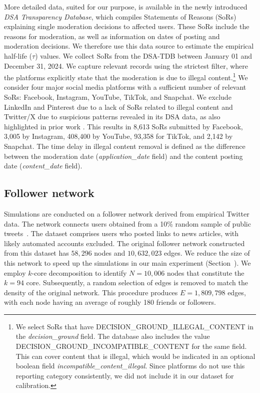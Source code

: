 \documentclass{article}
\begin{document}
More detailed data, suited for our purpose, is available in the newly introduced \textit{DSA Transparency Database}, which compiles Statements of Reasons (SoRs) explaining single moderation decisions to affected users. These SoRs include the reasons for moderation, as well as information on dates of posting and moderation decisions. We therefore use this data source to estimate the empirical half-life ($\tau$) values. We collect SoRs from the DSA-TDB between January 01 and December 31, 2024. We capture relevant records using the strictest filter, where the platforms explicitly state that the moderation is due to illegal content.\footnote{We select SoRs that have DECISION\_GROUND\_ILLEGAL\_CONTENT in the \textit{decision\_ground} field. The database also includes the value DECISION\_GROUND\_INCOMPATIBLE\_CONTENT for the same field. This can cover content that is illegal, which would be indicated in an optional boolean field \textit{incompatible\_content\_illegal}. Since platforms do not use this reporting category consistently, we did not include it in our dataset for calibration.} 
We consider four major social media platforms with a sufficient number of relevant SoRs: Facebook, Instagram, YouTube, TikTok, and Snapchat. We exclude LinkedIn and Pinterest due to a lack of SoRs related to illegal content and Twitter/X due to suspicious patterns revealed in its DSA data, as also highlighted in prior work \cite{trujillo2023dsa}. 
This results in 8,613 SoRs submitted by Facebook, 3,005 by Instagram, 408,400 by YouTube, 93,358 for TikTok, and 2,142 by Snapchat. 
The time delay in illegal content removal is defined as the difference between the moderation date (\textit{application\_date} field) and the content posting date (\textit{content\_date} field). 
 
\subsection*{Follower network}

Simulations are conducted on a follower network derived from empirical Twitter data. The network connects users obtained from a 10\% random sample of public tweets~\cite{Nikolov2020dataset}. The dataset comprises users who posted links to news articles, with likely automated accounts excluded. The original follower network constructed from this dataset has $58{,}296$ nodes and $10{,}632{,}023$ edges. 
We reduce the size of this network to speed up the simulations in our main experiment (Section~). We employ $k$-core decomposition to identify $N = 10{,}006$ nodes that constitute the $k = 94$ core. Subsequently, a random selection of edges is removed to match the density of the original network. This procedure produces $E = 1{,}809{,}798$ edges, with each node having an average of roughly 180 friends or followers.
\end{document}
